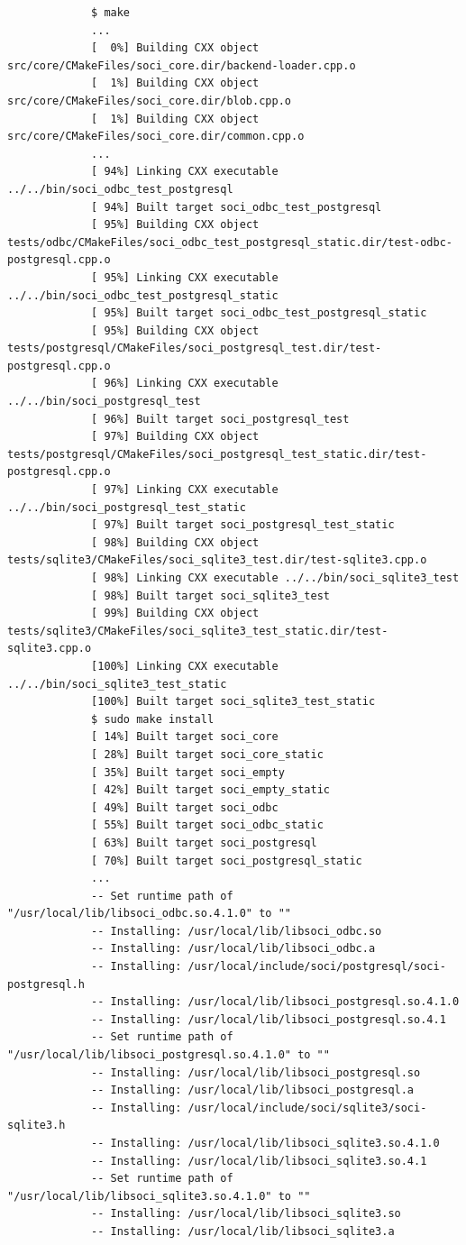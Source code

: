 \documentclass[]{scrartcl}
\begin{document}
\begin{tiny}
\begin{verbatim}
			 $ make
			 ...
			 [  0%] Building CXX object src/core/CMakeFiles/soci_core.dir/backend-loader.cpp.o
			 [  1%] Building CXX object src/core/CMakeFiles/soci_core.dir/blob.cpp.o
			 [  1%] Building CXX object src/core/CMakeFiles/soci_core.dir/common.cpp.o
			 ...
			 [ 94%] Linking CXX executable ../../bin/soci_odbc_test_postgresql
			 [ 94%] Built target soci_odbc_test_postgresql
			 [ 95%] Building CXX object tests/odbc/CMakeFiles/soci_odbc_test_postgresql_static.dir/test-odbc-postgresql.cpp.o
			 [ 95%] Linking CXX executable ../../bin/soci_odbc_test_postgresql_static
			 [ 95%] Built target soci_odbc_test_postgresql_static
			 [ 95%] Building CXX object tests/postgresql/CMakeFiles/soci_postgresql_test.dir/test-postgresql.cpp.o
			 [ 96%] Linking CXX executable ../../bin/soci_postgresql_test
			 [ 96%] Built target soci_postgresql_test
			 [ 97%] Building CXX object tests/postgresql/CMakeFiles/soci_postgresql_test_static.dir/test-postgresql.cpp.o
			 [ 97%] Linking CXX executable ../../bin/soci_postgresql_test_static
			 [ 97%] Built target soci_postgresql_test_static
			 [ 98%] Building CXX object tests/sqlite3/CMakeFiles/soci_sqlite3_test.dir/test-sqlite3.cpp.o
			 [ 98%] Linking CXX executable ../../bin/soci_sqlite3_test
			 [ 98%] Built target soci_sqlite3_test
			 [ 99%] Building CXX object tests/sqlite3/CMakeFiles/soci_sqlite3_test_static.dir/test-sqlite3.cpp.o
			 [100%] Linking CXX executable ../../bin/soci_sqlite3_test_static
			 [100%] Built target soci_sqlite3_test_static
			 $ sudo make install
			 [ 14%] Built target soci_core
			 [ 28%] Built target soci_core_static
			 [ 35%] Built target soci_empty
			 [ 42%] Built target soci_empty_static
			 [ 49%] Built target soci_odbc
			 [ 55%] Built target soci_odbc_static
			 [ 63%] Built target soci_postgresql
			 [ 70%] Built target soci_postgresql_static
			 ...
			 -- Set runtime path of "/usr/local/lib/libsoci_odbc.so.4.1.0" to ""
			 -- Installing: /usr/local/lib/libsoci_odbc.so
			 -- Installing: /usr/local/lib/libsoci_odbc.a
			 -- Installing: /usr/local/include/soci/postgresql/soci-postgresql.h
			 -- Installing: /usr/local/lib/libsoci_postgresql.so.4.1.0
			 -- Installing: /usr/local/lib/libsoci_postgresql.so.4.1
			 -- Set runtime path of "/usr/local/lib/libsoci_postgresql.so.4.1.0" to ""
			 -- Installing: /usr/local/lib/libsoci_postgresql.so
			 -- Installing: /usr/local/lib/libsoci_postgresql.a
			 -- Installing: /usr/local/include/soci/sqlite3/soci-sqlite3.h
			 -- Installing: /usr/local/lib/libsoci_sqlite3.so.4.1.0
			 -- Installing: /usr/local/lib/libsoci_sqlite3.so.4.1
			 -- Set runtime path of "/usr/local/lib/libsoci_sqlite3.so.4.1.0" to ""
			 -- Installing: /usr/local/lib/libsoci_sqlite3.so
			 -- Installing: /usr/local/lib/libsoci_sqlite3.a
		\end{verbatim}
	\end{tiny} 
	
\end{document}

